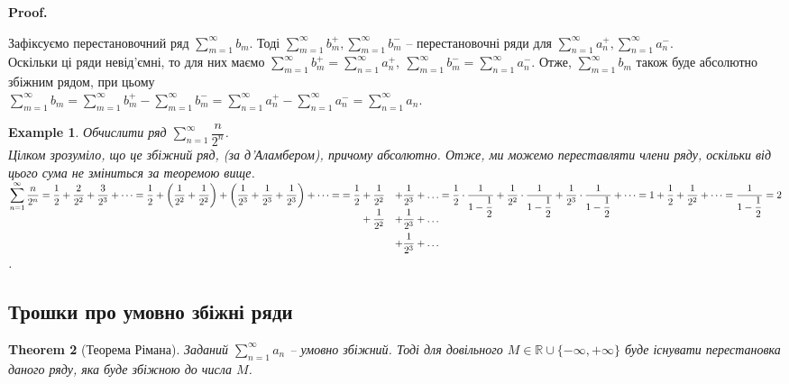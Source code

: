 \documentclass[a4paper, 10pt]{article}
\makeatletter
\def\huge{\displaystyle}
\theoremstyle{theoremdd}
\newtheorem{theorem}{Theorem}[subsection]
\theoremstyle{theoremdd}
\theoremstyle{theoremdd}
\theoremstyle{theoremdd}
\theoremstyle{theoremdd}
\newtheorem{example}[theorem]{Example}
\theoremstyle{theoremdd}
\theoremstyle{theoremdd}
\theoremstyle{theoremdd}
\theoremstyle{theoremdd}
\renewenvironment{proof}[1][Proof.\\]{\par
\pushQED{\hfill \qed}%
\normalfont \topsep6\p@\@plus6\p@\relax
\trivlist
\item\relax
{\bfseries
#1\@addpunct{.}}\hspace\labelsep\ignorespaces
}{%
\popQED\endtrivlist\@endpefalse
}
\makeatother
\begin{document}
\begin{proof}
Зафіксуємо перестановочний ряд $\displaystyle\sum_{m=1}^\infty b_m$. Тоді $\displaystyle\sum_{m=1}^\infty b_m^+, \sum_{m=1}^\infty b_m^-$ -- перестановочні ряди для $\displaystyle\sum_{n=1}^\infty a_n^+,\sum_{n=1}^\infty a_n^-$.\\
Оскільки ці ряди невід'ємні, то для них маємо $\displaystyle\sum_{m=1}^\infty b_m^+ = \sum_{n=1}^\infty a_n^+,\ \sum_{m=1}^\infty b_m^- = \sum_{n=1}^\infty a_n^-$. Отже, $\displaystyle\sum_{m=1}^\infty b_m$ також буде абсолютно збіжним рядом, при цьому\\
$\displaystyle\sum_{m=1}^\infty b_m = \sum_{m=1}^\infty b_m^+ - \sum_{m=1}^\infty b_m^- = \sum_{n=1}^\infty a_n^+ - \sum_{n=1}^\infty a_n^- = \sum_{n=1}^\infty a_n$.
\end{proof}

\begin{example}
Обчислити ряд $\displaystyle\sum_{n=1}^\infty \dfrac{n}{2^n}$.\\
Цілком зрозуміло, що це збіжний ряд, (за д'Аламбером), причому абсолютно. Отже, ми можемо переставляти члени ряду, оскільки від цього сума не зміниться за теоремою вище.\\
$\displaystyle\sum_{n=1}^\infty \dfrac{n}{2^n} = \dfrac{1}{2} + \dfrac{2}{2^2} + \dfrac{3}{2^3} + \dots = \dfrac{1}{2} + \left( \dfrac{1}{2^2} + \dfrac{1}{2^2} \right) + \left( \dfrac{1}{2^3} + \dfrac{1}{2^3} + \dfrac{1}{2^3} \right) + \dots = \\
\begin{aligned}[t]
= \dfrac{1}{2} & + \dfrac{1}{2^2} & + \dfrac{1}{2^3} + \dots \\
& + \dfrac{1}{2^2} & + \dfrac{1}{2^3} + \dots \\
& & + \dfrac{1}{2^3} + \dots
\end{aligned} \\
 = \dfrac{1}{2} \cdot \dfrac{1}{1-\dfrac{1}{2}} + \dfrac{1}{2^2} \cdot \dfrac{1}{1-\dfrac{1}{2}} + \dfrac{1}{2^3} \cdot \dfrac{1}{1-\dfrac{1}{2}} + \dots = 1 + \dfrac{1}{2} + \dfrac{1}{2^2} + \dots = \dfrac{1}{1-\dfrac{1}{2}} = 2$.
\end{example}

\subsection{Трошки про умовно збіжні ряди}
\begin{theorem}[Теорема Рімана]
Заданий $\huge \sum_{n=1}^\infty a_n$ -- умовно збіжний. Тоді для довільного $M \in \mathbb{R} \cup \{-\infty, +\infty\}$ буде існувати перестановка даного ряду, яка буде збіжною до числа $M$.
\end{theorem}
\end{document}
